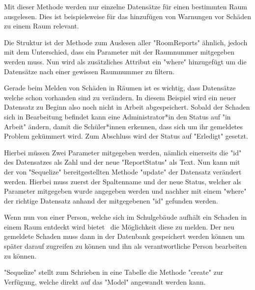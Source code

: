 Mit dieser Methode werden nur einzelne Datensätze für einen bestimmten Raum ausgelesen. Dies ist beispielsweise für das hinzufügen von Warnungen vor Schäden zu einem Raum relevant. 

Die Struktur ist der Methode zum Auslesen aller "RoomReports" ähnlich, jedoch mit dem Unterschied, dass ein Parameter mit der Raumnummer mitgegeben werden muss. Nun wird als zusätzliches Attribut ein "where" hinzugefügt um die Datensätze nach einer gewissen Raumnummer zu filtern.



Gerade beim Melden von Schäden in Räumen ist es wichtig, dass Datensätze welche schon vorhanden sind zu verändern. In diesem Beispiel wird ein neuer Datensatz zu Beginn also noch nicht in Arbeit abgespeichert. Sobald der Schaden sich in Bearbeitung befindet kann eine Administrator*in den Status auf "in Arbeit" ändern, damit die Schüler*innen erkennen, dass sich um ihr gemeldetes Problem gekümmert wird. Zum Abschluss wird der Status auf "Erledigt" gesetzt.

Hierbei müssen Zwei Parameter mitgegeben werden, nämlich einerseits die "id" des Datensatzes als Zahl und der neue "ReportStatus" als Text. Nun kann mit der von "Sequelize" bereitgestellten Methode "update" der Datensatz verändert werden. Hierbei muss zuerst der Spaltenname und der neue Status, welcher als Parameter mitgegeben wurde angegeben werden und nachher mit einem "where" der richtige Datensatz anhand der mitgegebenen "id" gefunden werden.



Wenn nun von einer Person, welche sich im Schulgebäude aufhält ein Schaden in einem Raum entdeckt wird bietet \ZELIA\ die Möglichkeit diese zu melden. Der neu gemeldete Schaden muss dann in der Datenbank gespeichert werden können um später darauf zugreifen zu können und ihn als verantwortliche Person bearbeiten zu können.

"Sequelize" stellt zum Schrieben in eine Tabelle die Methode "create" zur Verfügung, welche direkt auf das "Model" angewandt werden kann.

